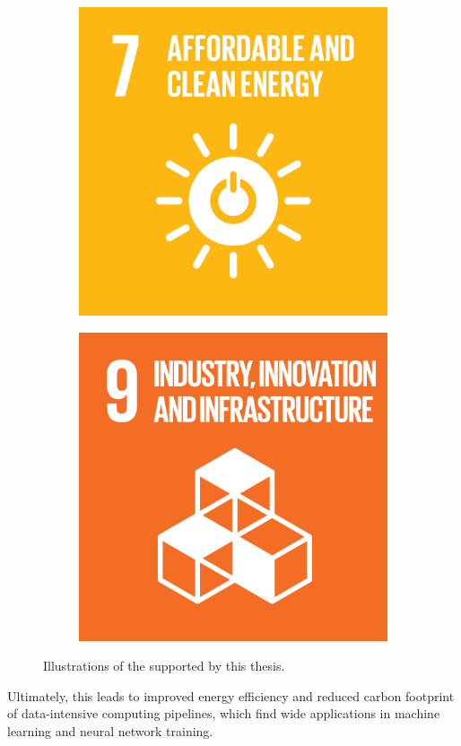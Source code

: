 \begin{figure}
    \centering
    \begin{subfigure}[b]{0.5\linewidth}
        \centering
        \includegraphics[width=0.6\linewidth]{figures/1-introduction/E_SDG_goals_icons-07.png} 
        \label{fig:sdg07}
    \end{subfigure}\hfill
    \begin{subfigure}[b]{0.5\linewidth}
        \centering
        \includegraphics[width=0.6\linewidth]{figures/1-introduction/E_SDG-goals_icons-09.png}
        \label{fig:sdg09}
	\end{subfigure}
	\caption[Sustainable Development Goals supported by this thesis]{Illustrations of the  supported by this thesis.}
	\label{fig:sdgs}
\end{figure}

Ultimately, this leads to improved energy efficiency and reduced carbon footprint of data-intensive computing pipelines, which find wide applications in machine learning and neural network training.
